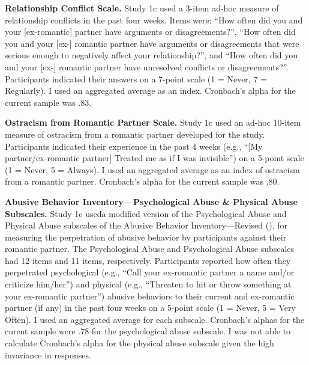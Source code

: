 \documentclass[
]{udthesis}
\begin{document}
\textbf{Relationship Conflict Scale.} Study 1c used a 3-item ad-hoc measure of relationship conflicts in the past four weeks. Items were: ``How often did you and your {[}ex-romantic{]} partner have arguments or disagreements?'', ``How often did you and your {[}ex-{]} romantic partner have arguments or disagreements that were serious enough to negatively affect your relationship?'', and ``How often did you and your {[}ex-{]} romantic partner have unresolved conflicts or disagreements?''. Participants indicated their answers on a 7-point scale (1 = Never, 7 = Regularly). I used an aggregated average as an index. Cronbach's alpha for the current sample was .83.

\textbf{Ostracism from Romantic Partner Scale.} Study 1c used an ad-hoc 10-item measure of ostracism from a romantic partner developed for the study. Participants indicated their experience in the past 4 weeks (e.g., ``{[}My partner/ex-romantic partner{]} Treated me as if I was invisible'') on a 5-point scale (1 = Never, 5 = Always). I used an aggregated average as an index of ostracism from a romantic partner. Cronbach's alpha for the current sample was .80.

\textbf{Abusive Behavior Inventory---Psychological Abuse \& Physical Abuse Subscales.} Study 1c useda modified version of the Psychological Abuse and Physical Abuse subscales of the Abusive Behavior Inventory---Revised (), for measuring the perpetration of abusive behavior by participants against their romantic partner. The Psychological Abuse and Psychological Abuse subscales had 12 items and 11 items, respectively. Participants reported how often they perpetrated psychological (e.g., ``Call your ex-romantic partner a name and/or criticize him/her'') and physical (e.g., ``Threaten to hit or throw something at your ex-romantic partner'') abusive behaviors to their current and ex-romantic partner (if any) in the past four weeks on a 5-point scale (1 = Never, 5 = Very Often). I used an aggregated average for each subscale. Cronbach's alphas for the curent sample were .78 for the psychological abuse subscale. I was not able to calculate Cronbach's alpha for the physical abuse subscale given the high invariance in responses.
\end{document}
